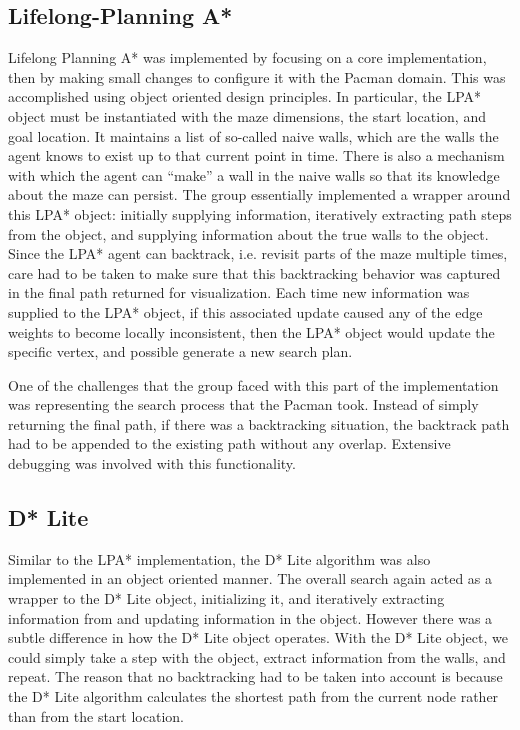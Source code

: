 \subsection{Lifelong-Planning A*}
	Lifelong Planning A* was implemented by focusing on a core implementation, then by making small changes to configure it with the Pacman domain. This was accomplished using object oriented design principles. In particular, the LPA* object must be instantiated with the maze dimensions, the start location, and goal location. It maintains a list of so-called naive walls, which are the walls the agent knows to exist up to that current point in time. There is also a mechanism with which the agent can ``make'' a wall in the naive walls so that its knowledge about the maze can persist. The group essentially implemented a wrapper around this LPA* object: initially supplying information, iteratively extracting path steps from the object, and supplying information about the true walls to the object. Since the LPA* agent can backtrack, i.e. revisit parts of the maze multiple times, care had to be taken to make sure that this backtracking behavior was captured in the final path returned for visualization. Each time new information was supplied to the LPA* object, if this associated update caused any of the edge weights to become locally inconsistent, then the LPA* object would update the specific vertex, and possible generate a new search plan.
	
	One of the challenges that the group faced with this part of the implementation was representing the search process that the Pacman took. Instead of simply returning the final path, if there was a backtracking situation, the backtrack path had to be appended to the existing path without any overlap. Extensive debugging was involved with this functionality.
	

\subsection{D* Lite}
	Similar to the LPA* implementation, the D* Lite algorithm was also implemented in an object oriented manner. The overall search again acted as a wrapper to the D* Lite object, initializing it, and iteratively extracting information from and updating information in the object. However there was a subtle difference in how the D* Lite object operates. With the D* Lite object, we could simply take a step with the object, extract information from the walls, and repeat. The reason that no backtracking had to be taken into account is because the D* Lite algorithm calculates the shortest path from the current node rather than from the start location. 
	
